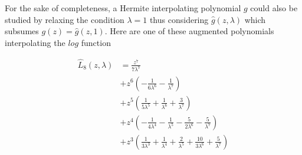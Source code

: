 \begin{remark}
For the sake of completeness, a Hermite interpolating polynomial $g$ could
also be studied by relaxing the condition $\lambda=1$ thus considering
$\hat{g}(z,\lambda)$ which subsumes $g(z)=\hat{g}(z,1)$. Here are one of these
augmented polynomials interpolating the $log$ function
\iffalse
\begin{displaymath}
\begin{split}
\hat{I}_{8}{\left (z, \lambda \right )} &= - \frac{z^{7}}{\lambda^{8}} \\
&+ z^{6} \left(\frac{1}{\lambda^{7}} + \frac{7}{\lambda^{8}}\right) \\
&+ z^{5} \left(- \frac{1}{\lambda^{6}} - \frac{6}{\lambda^{7}} - \frac{21}{\lambda^{8}}\right) \\
&+ z^{4} \left(\frac{1}{\lambda^{5}} + \frac{5}{\lambda^{6}} + \frac{15}{\lambda^{7}} + \frac{35}{\lambda^{8}}\right) \\
&+ z^{3} \left(- \frac{1}{\lambda^{4}} - \frac{4}{\lambda^{5}} - \frac{10}{\lambda^{6}} - \frac{20}{\lambda^{7}} - \frac{35}{\lambda^{8}}\right) \\
&+ z^{2} \left(\frac{1}{\lambda^{3}} + \frac{3}{\lambda^{4}} + \frac{6}{\lambda^{5}} + \frac{10}{\lambda^{6}} + \frac{15}{\lambda^{7}} + \frac{21}{\lambda^{8}}\right) \\
&+ z \left(- \frac{1}{\lambda^{2}} - \frac{2}{\lambda^{3}} - \frac{3}{\lambda^{4}} - \frac{4}{\lambda^{5}} - \frac{5}{\lambda^{6}} - \frac{6}{\lambda^{7}} - \frac{7}{\lambda^{8}}\right) \\
&+ \frac{1}{\lambda} + \frac{1}{\lambda^{2}} + \frac{1}{\lambda^{3}} + \frac{1}{\lambda^{4}} + \frac{1}{\lambda^{5}} + \frac{1}{\lambda^{6}} + \frac{1}{\lambda^{7}} + \frac{1}{\lambda^{8}}
\end{split}
\end{displaymath}
and
\fi
\begin{displaymath}
\begin{split}
\hat{L}_{8}{\left (z,\lambda \right )} &= \frac{z^{7}}{7 \lambda^{7}} \\
&+ z^{6} \left(- \frac{1}{6 \lambda^{6}} - \frac{1}{\lambda^{7}}\right) \\
&+ z^{5} \left(\frac{1}{5 \lambda^{5}} + \frac{1}{\lambda^{6}} + \frac{3}{\lambda^{7}}\right) \\
&+ z^{4} \left(- \frac{1}{4 \lambda^{4}} - \frac{1}{\lambda^{5}} - \frac{5}{2 \lambda^{6}} - \frac{5}{\lambda^{7}}\right) \\
&+ z^{3} \left(\frac{1}{3 \lambda^{3}} + \frac{1}{\lambda^{4}} + \frac{2}{\lambda^{5}} + \frac{10}{3 \lambda^{6}} + \frac{5}{\lambda^{7}}\right) \\

\end{split}
\end{displaymath}
\end{remark}
